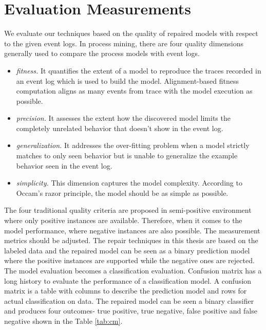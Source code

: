 \section{Evaluation Measurements}
We evaluate our techniques based on the quality of repaired models with respect to the given event logs. In process mining, there are four quality dimensions generally used to compare the process models with event logs. 
\begin{itemize}
	\item \emph{fitness.} It quantifies the extent of a model to reproduce the traces recorded in an event log which is used to build the model. Alignment-based fitness computation aligns as many events from trace with the model execution as possible.  
	\item \emph{precision.} It assesses the extent how the discovered model limits the completely unrelated behavior that doesn't show in the event log. 
	\item \emph{generalization.} It addresses the over-fitting problem when a model strictly matches to only seen behavior but is unable to generalize the example behavior seen in the event log. 
	\item \emph{simplicity.} This dimension captures the model complexity. According to Occam's razor principle, the model should be as simple as possible.
\end{itemize}
The four traditional quality criteria are proposed in semi-positive environment where only positive instances are available. Therefore, when it comes to the model performance, where negative instances are also possible. The measurement metrics should be adjusted. The repair techniques in this thesis are based on the labeled data and the repaired model can be seen as a binary prediction model where the positive instances are supported while the negative ones are rejected. The model evaluation becomes a classification evaluation. 
Confusion matrix has a long history to evaluate the performance of a  classification model. %
A confusion matrix is a table with columns to describe the prediction model and rows for actual classification on data.  The repaired model can be seen a binary classifier and produces four outcomes- true positive, true negative, false positive and false negative shown in the Table \ref{tab:cm}.
